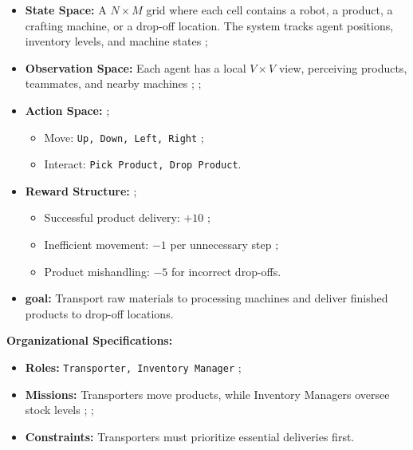 \documentclass[pdflatex,sn-mathphys-num]{sn-jnl}%
\theoremstyle{thmstyleone}%
\theoremstyle{thmstyletwo}%
\theoremstyle{thmstylethree}%
\begin{document}
\begin{itemize}
    \item \textbf{State Space:} A $N \times M$ grid where each cell contains a robot, a product, a crafting machine, or a drop-off location. The system tracks agent positions, inventory levels, and machine states ;
    \item \textbf{Observation Space:} Each agent has a local $V \times V$ view, perceiving products, teammates, and nearby machines ; ;
    \item \textbf{Action Space:}  ;
    \begin{itemize}
        \item Move: \texttt{Up, Down, Left, Right} ;
        \item Interact: \texttt{Pick Product, Drop Product}.
    \end{itemize}
    \item \textbf{Reward Structure:} ;
    \begin{itemize}
        \item Successful product delivery: $+10$ ;
        \item Inefficient movement: $-1$ per unnecessary step ;
        \item Product mishandling: $-5$ for incorrect drop-offs.
    \end{itemize}
    \item \textbf{goal:} Transport raw materials to processing machines and deliver finished products to drop-off locations.
\end{itemize}

\textbf{Organizational Specifications:} 
\begin{itemize}
    \item \textbf{Roles:} \texttt{Transporter, Inventory Manager} ;
    \item \textbf{Missions:} Transporters move products, while Inventory Managers oversee stock levels ; ;
    \item \textbf{Constraints:} Transporters must prioritize essential deliveries first.
\end{itemize}
\end{document}
